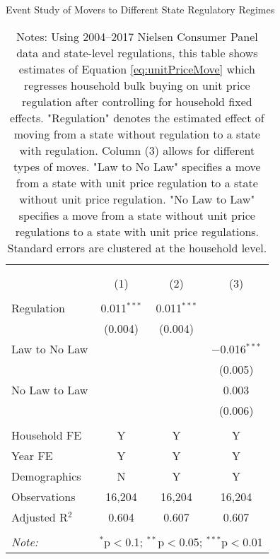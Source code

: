 \begin{table}[!htbp] \centering
  \caption{Event Study of Movers to Different State Regulatory Regimes}
  \label{tab:unitPriceLawMovers}
\begin{tabular}{@{\extracolsep{5pt}}lccc}
\\[-1.8ex]\hline
\hline \\[-1.8ex]
\\[-1.8ex] & (1) & (2) & (3)\\
\hline \\[-1.8ex]
 Regulation & 0.011$^{***}$ & 0.011$^{***}$ &  \\
  & (0.004) & (0.004) &  \\
  Law to No Law &  &  & $-$0.016$^{***}$ \\
  &  &  & (0.005) \\
  No Law to Law &  &  & 0.003 \\
  &  &  & (0.006) \\
 \hline \\[-1.8ex]
Household FE & Y & Y & Y \\
Year FE & Y & Y & Y \\
Demographics & N & Y & Y \\
Observations & 16,204 & 16,204 & 16,204 \\
Adjusted R$^{2}$ & 0.604 & 0.607 & 0.607 \\
\hline
\hline \\[-1.8ex]
\textit{Note:}  & \multicolumn{3}{l}{$^{*}$p$<$0.1; $^{**}$p$<$0.05; $^{***}$p$<$0.01} \\
\end{tabular}
\caption*{Notes: Using 2004--2017 Nielsen Consumer Panel data and state-level regulations, this table shows estimates of Equation \ref{eq:unitPriceMove} which regresses household bulk buying on unit price regulation after controlling for household fixed effects. "Regulation" denotes the estimated effect of moving from a state without regulation to a state with regulation. Column (3) allows for different types of moves. "Law to No Law" specifies a move from a state with unit price regulation to a state without unit price regulation. "No Law to Law" specifies a move from a state without unit price regulations to a state with unit price regulations. Standard errors are clustered at the household level.}
\end{table}
